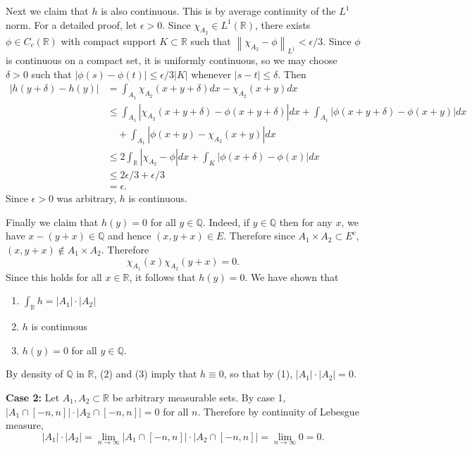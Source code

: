 \documentclass[answers]{exam}
\theoremstyle{problemstyle}
\newcommand{\norm}[1]{\left\lVert#1\right\rVert} %
\newcommand{\1}[1]{\textbf{1}_{\left[#1\right]}} %
\def\R{\mathbb{R}} %
\def\Q{\mathbb{Q}} %
\begin{document}
\begin{questions}
\begin{solution}
  Next we claim that $h$ is also continuous. This is by average continuity of the $L^{1}$ norm. For a detailed proof, let $\epsilon>0$. Since $\chi_{A_{2}}\in L^{1}(\R)$, there exists $\phi\in C_{c}(\R)$ with compact support $K\subset \R$ such that $\norm{\chi_{A_{2}}-\phi}_{L^{1}}<\epsilon/3$. Since $\phi$ is continuous on a compact set, it is uniformly continuous, so we may choose $\delta>0$ such that $|\phi(s)-\phi(t)|\leq\epsilon/3|K|$ whenever $|s-t|\leq\delta$. Then
  \begin{align*}
    |h(y+\delta)-h(y)|
    &= \int_{A_{1}}\chi_{A_{2}}(x+y+\delta)dx - \chi_{A_{2}}(x+y)dx\\
    &\leq \int_{A_{1}}|\chi_{A_{2}}(x+y+\delta) -\phi(x+y+\delta)|dx +\int_{A_{1}}|\phi(x+y+\delta)-\phi(x+y)|dx\\
    &\quad+\int_{A_{1}}|\phi(x+y) - \chi_{A_{2}}(x+y)|dx\\
    &\leq 2\int_{\R}|\chi_{A_{2}} -\phi|dx +\int_{K}|\phi(x+\delta)-\phi(x)|dx\\
    &\leq 2\epsilon/3 + \epsilon/3\\
    &= \epsilon.
  \end{align*}
  Since $\epsilon>0$ was arbitrary, $h$ is continuous.

  Finally we claim that $h(y)=0$ for all $y\in \Q$. Indeed, if $y\in \Q$ then for any $x$, we have $x-(y+x)\in \Q$ and hence $(x,y+x)\in E$. Therefore since $A_{1}\times A_{2}\subset E^{c}$, $(x,y+x)\notin A_{1}\times A_{2}$. Therefore 
  \begin{equation*}
    \chi_{A_{1}}(x)\chi_{A_{2}}(y+x)=0.
  \end{equation*}
  Since this holds for all $x\in \R$, it follows that $h(y)= 0$.
  We have shown that
  \begin{enumerate}
  \item $\int_{\R} h = |A_{1}|\cdot |A_{2}|$
  \item $h$ is continuous
  \item $h(y) = 0$ for all $y\in \Q$.
  \end{enumerate}
  By density of $\Q$ in $\R$, (2) and (3) imply that $h\equiv 0$, so that by (1), $|A_{1}|\cdot |A_{2}| = 0$.

  \textbf{Case 2:} Let $A_{1},A_{2}\subset \R$ be arbitrary measurable sets. By case 1,  $|A_{1}\cap [-n,n]|\cdot |A_{2}\cap [-n,n]| =0$ for all $n$. Therefore by continuity of Lebesgue measure,
  \begin{equation*}
    |A_{1}|\cdot|A_{2}| = \lim_{n\to\infty}|A_{1}\cap [-n,n]|\cdot |A_{2}\cap [-n,n]| =\lim_{n\to\infty}0=0.
  \end{equation*}
\end{solution}







\end{questions}
\end{document}
